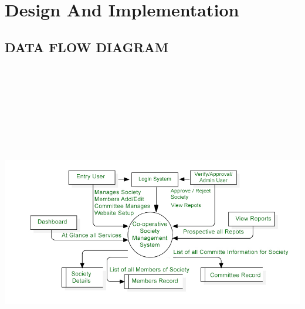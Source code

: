 \chapter{Design And Implementation}
\section{DATA FLOW DIAGRAM}
\includegraphics[width=14cm, height=15cm]{Chap3/1.jpg}

